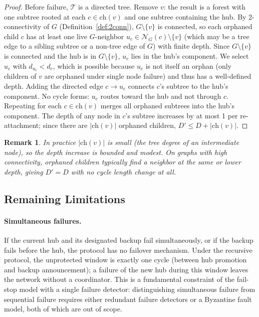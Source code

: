 \documentclass{article}
\newtheorem{remark}{Remark}
\begin{document}
\begin{proof}
    Before failure, $\mathcal{T}$ is a directed tree. Remove $v$: the result is a forest
    with one subtree rooted at each $c \in \mathrm{ch}(v)$ and one subtree containing the
    hub. By 2-connectivity of $G$ (Definition~\ref{def:2conn}), $G \setminus \{v\}$ is
    connected, so each orphaned child $c$ has at least one live $G$-neighbor $u_c \in
    \mathcal{N}_G(c) \setminus \{v\}$ (which may be a tree edge to a sibling subtree or
    a non-tree edge of $G$) with finite depth. Since $G \setminus \{v\}$ is connected and
    the hub is in $G \setminus \{v\}$, $u_c$ lies in the hub's component. We select $u_c$
    with $d_{u_c} < d_c$, which is possible because $u_c$ is not itself an orphan (only
    children of $v$ are orphaned under single node failure) and thus has a well-defined
    depth. Adding the directed edge $c \to u_c$ connects $c$'s subtree to the hub's
    component. No cycle forms: $u_c$ routes toward the hub and not through $c$. Repeating
    for each $c \in \mathrm{ch}(v)$ merges all orphaned subtrees into the hub's component.
    The depth of any node in $c$'s
    subtree increases by at most 1 per re-attachment; since there are $|\mathrm{ch}(v)|$
    orphaned children, $D' \leq D + |\mathrm{ch}(v)|$.
\end{proof}

\begin{remark}
    In practice $|\mathrm{ch}(v)|$ is small (the tree degree of an intermediate node),
    so the depth increase is bounded and modest. On graphs with high connectivity,
    orphaned children typically find a neighbor at the same or lower depth, giving
    $D' = D$ with no cycle length change at all.
\end{remark}

\subsection{Remaining Limitations}

\paragraph{Simultaneous failures.}
If the current hub and its designated backup fail simultaneously, or if the backup fails
before the hub, the protocol has no failover mechanism. Under the recursive protocol,
the unprotected window is exactly one cycle (between hub promotion and backup
announcement); a failure of the new hub during this window leaves the network without a
coordinator. This is a fundamental constraint of the fail-stop model with a single
failure detector: distinguishing simultaneous failure from sequential failure requires
either redundant failure detectors or a Byzantine fault model, both of which are out of
scope.
\end{document}
